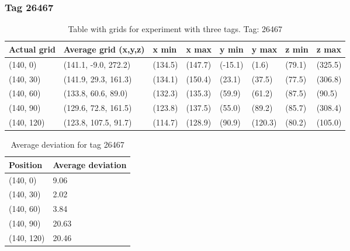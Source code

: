 \subsubsection{Tag 26467}
\begin{table}[H] 
    \begin{tabular}{|l|l|l|l|l|l|l|l|}
    \hline
    Actual grid & Average grid (x,y,z)   & x min   & x max   & y min    & y max   & z min   & z max    \\ \hline
    (140, 0)     & (141.1, -9.0, 272.2)      & (134.5)     & (147.7)    & (-15.1)     & (1.6)      & (79.1)     & (325.5)     \\ \hline
    (140, 30)     & (141.9, 29.3, 161.3)      & (134.1)     & (150.4)    & (23.1)     & (37.5)      & (77.5)     & (306.8)     \\ \hline
    (140, 60)     & (133.8, 60.6, 89.0)      & (132.3)     & (135.3)    & (59.9)     & (61.2)      & (87.5)     & (90.5)     \\ \hline
    (140, 90)     & (129.6, 72.8, 161.5)      & (123.8)     & (137.5)    & (55.0)     & (89.2)      & (85.7)     & (308.4)     \\ \hline
    (140, 120)     & (123.8, 107.5, 91.7)      & (114.7)     & (128.9)    & (90.9)     & (120.3)      & (80.2)     & (105.0)     \\ \hline
\end{tabular}
\label{Tab:three-tag-experiment-result-tag-26467}
\caption{Table with grids for experiment with three tags. Tag: 26467}
\end{table}

\begin{table}[]
    \centering
    \begin{tabular}{|l|l|}
    \hline
    Position   & Average deviation \\ \hline
    (140, 0)   & 9.06              \\ \hline
    (140, 30)  & 2.02              \\ \hline
    (140, 60)  & 3.84              \\ \hline
    (140, 90)  & 20.63             \\ \hline
    (140, 120) & 20.46             \\ \hline
    \end{tabular}
    \caption{Average deviation for tag 26467}
\end{table}

